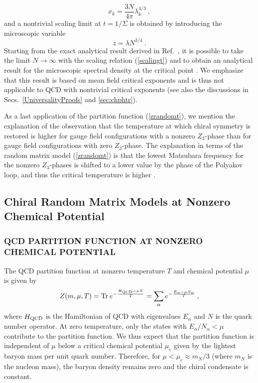 \begin{equation}
  x_k = \frac {3N}{4\pi} \lambda_k^{4/3}\:,
\end{equation}
and a nontrivial scaling limit at $t=1/\Sigma$ is obtained by
introducing the microscopic variable \cite{Hikami-Brezin,Jani98a}
\begin{equation}
  z = \lambda N^{3/4}\:.
  \label{scalingt}
\end{equation}
Starting from the exact analytical result derived in Ref.~\cite{senert}, it
is possible to take the limit $N\rightarrow \infty$ with the scaling
relation (\ref{scalingt}) and to obtain an analytical result for the
microscopic spectral density at the critical point
\cite{Hikami-Brezin,Jani98a}.  We emphasize that this result is based
on mean field critical exponents and is thus not applicable to QCD
with nontrivial critical exponents (see also the discussions in
Secs.~\ref{UniversalityProofs} and \ref{sec:chphtr}).
 
As a last application of the partition function (\ref{zrandomt}), we
mention the explanation of the observation \cite{Chan95} that the
temperature at which chiral symmetry is restored is higher for gauge
field configurations 
with a nonzero $Z_3$-phase than for gauge field
configurations with zero $Z_3$-phase. The explanation in terms of the
random matrix model (\ref{zrandomt}) is that the lowest
Matsubara frequency for the nonzero $Z_3$-phases is shifted to a lower
value by the phase of the Polyakov loop, and thus the critical
temperature is higher \cite{mishat}.


\subsection{Chiral Random Matrix Models at Nonzero Chemical Potential}

\subsubsection{QCD PARTITION FUNCTION AT NONZERO CHEMICAL POTENTIAL}

The QCD partition function at nonzero temperature $T$ and chemical
potential $\mu$ is given by \cite{phase}
\begin{equation}
  Z(m,\mu,T) ={\rm Tr\:} e^{-\frac{H_{\rm QCD} -\mu N}T}
  =\sum_\alpha e^{-\frac{E_\alpha-\mu N_\alpha}{T}}\:,
\end{equation}
where $H_{\rm QCD}$ is the Hamiltonian of QCD with eigenvalues
$E_\alpha$ and $N$ is the quark number operator. At zero temperature,
only the states with $E_\alpha/N_{\alpha} < \mu$ contribute to the
partition function. We thus expect that the partition function is
independent of $\mu$ below a critical chemical potential $\mu_c$ given
by the lightest baryon mass per unit quark number.  Therefore, for
$\mu < \mu_c \approx m_N/3$ (where $m_N$ is the nucleon mass), the
baryon density remains zero and the chiral condensate is constant.

